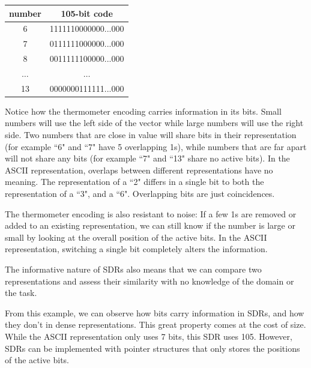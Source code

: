 \documentclass[runningheads]{llncs}
\begin{document}
\begin{center}
\label{tab:sdr}
 \begin{tabular}{||c c||} 
 \hline
 number & 105-bit code \\ [0.5ex] 
 \hline\hline
 6 & 1111110000000...000 \\
 \hline
 7 & 0111111000000...000 \\
 \hline
 8 & 0011111100000...000 \\
 \hline
 $\dots$ & $\dots$\\
 \hline
 13 & 0000000111111...000 \\
 \hline
\end{tabular}
\end{center}

Notice how the thermometer encoding carries information in its bits. Small numbers will use the left side of the vector while large numbers will use the right side. Two numbers that are close in value will share bits in their representation (for example ``6" and ``7" have 5 overlapping 1s), while numbers that are far apart will not share any bits (for example ``7" and ``13" share no active bits).
In the ASCII representation, overlaps between different representations have no meaning. The representation of a ``2" differs in a single bit to both the representation of a ``3", and a ``6". Overlapping bits are just coincidences. 

The thermometer encoding is also resistant to noise: If a few 1s are removed or added to an existing representation, we can still know if the number is large or small by looking at the overall position of the active bits. In the ASCII representation, switching a single bit completely alters the information.

The informative nature of SDRs also means that we can compare two representations and assess their similarity with no knowledge of the domain or the task.

From this example, we can observe how bits carry information in SDRs, and how they don't in dense representations.
This great property comes at the cost of size. While the ASCII representation only uses 7 bits, this SDR uses 105. However, SDRs can be implemented with pointer structures that only stores the positions of the active bits.
\end{document}
